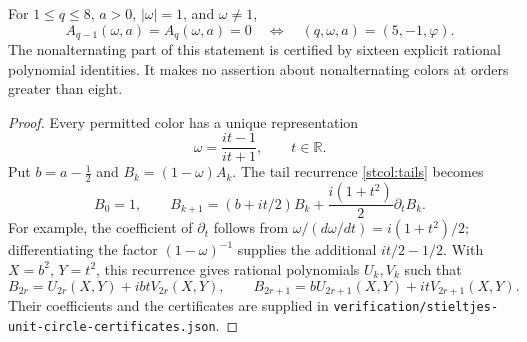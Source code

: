 \begin{theorem}
\label{stcol:circle-eight}
For $1\le q\le8$, $a>0$, $|\omega|=1$, and $\omega\ne1$,
\begin{equation}\label{stcol:circle-locus}
 A_{q-1}(\omega,a)=A_q(\omega,a)=0
 \quad\Longleftrightarrow\quad
 (q,\omega,a)=(5,-1,\varphi).
\end{equation}
The nonalternating part of this statement is certified by sixteen
explicit rational polynomial identities.  It makes no assertion about
nonalternating colors at orders greater than eight.
\end{theorem}
\begin{proof}
Every permitted color has a unique representation
\[
 \omega=\frac{it-1}{it+1},\qquad t\in\mathbb R.
\]
Put $b=a-\tfrac12$ and $B_k=(1-\omega)A_k$.  The tail recurrence
\eqref{stcol:tails} becomes
\begin{equation}\label{stcol:circle-recurrence}
 B_0=1,\qquad
 B_{k+1}=(b+it/2)B_k+\frac{i(1+t^2)}2\partial_tB_k.
\end{equation}
For example, the coefficient of $\partial_t$ follows from
$\omega/(d\omega/dt)=i(1+t^2)/2$; differentiating the factor
$(1-\omega)^{-1}$ supplies the additional $it/2-1/2$.
With $X=b^2$, $Y=t^2$, this recurrence gives rational polynomials
$U_k,V_k$ such that
\begin{equation}\label{stcol:circle-parity}
 B_{2r}=U_{2r}(X,Y)+ibtV_{2r}(X,Y),\qquad
 B_{2r+1}=bU_{2r+1}(X,Y)+itV_{2r+1}(X,Y).
\end{equation}
Their coefficients and the certificates are supplied in
\texttt{verification/stieltjes-unit-circle-certificates.json}.


\end{proof}
